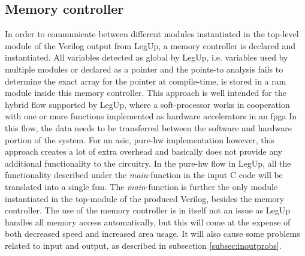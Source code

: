 \subsection{\label{subsec:memctrl}Memory controller}
In order to communicate between different modules instantiated in the top-level module of the Verilog output from LegUp, a memory controller is declared and instantiated. All variables detected as global by LegUp, i.e. variables used by multiple modules or declared as a pointer and the points-to analysis fails to determine the exact array for the pointer at compile-time, is stored in a \gls{ram} module inside this memory controller. This approach is well intended for the hybrid flow supported by LegUp, where a soft-processor works in cooperation with one or more functions implemented as hardware accelerators in an \gls{fpga} In this flow, the data needs to be transferred between the software and hardware portion of the system. For an \gls{asic}, pure-\gls{hw} implementation however, this approach creates a lot of extra overhead and basically does not provide any additional functionality to the circuitry. In the pure-\gls{hw} flow in LegUp, all the functionality described under the \textit{main}-function in the input C code will be translated into a single \gls{fsm}. The \textit{main}-function is further the only module instantiated in the top-module of the produced Verilog, besides the memory controller. The use of the memory controller is in itself not an issue as LegUp handles all memory access automatically, but this will come at the expense of both decreased speed and increased area usage. It will also cause some problems related to input and output, as described in subsection \ref{subsec:inoutprobs}.

